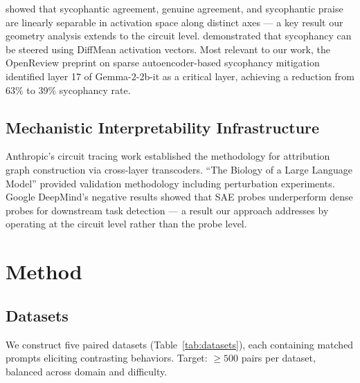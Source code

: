 \documentclass[11pt]{article}
\begin{document}
\citet{sycophancy2025notone} showed that sycophantic agreement, genuine agreement, and sycophantic praise are linearly separable in activation space along distinct axes — a key result our geometry analysis extends to the circuit level. \citet{rimsky2024steering} demonstrated that sycophancy can be steered using DiffMean activation vectors. Most relevant to our work, the OpenReview preprint on sparse autoencoder-based sycophancy mitigation \citep{sae_sycophancy2025} identified layer 17 of Gemma-2-2b-it as a critical layer, achieving a reduction from 63\% to 39\% sycophancy rate.

\subsection{Mechanistic Interpretability Infrastructure}

Anthropic's circuit tracing work \citep{anthropic2025circuit} established the methodology for attribution graph construction via cross-layer transcoders. ``The Biology of a Large Language Model'' \citep{biology2025} provided validation methodology including perturbation experiments. Google DeepMind's negative results \citep{gdm_negative2025} showed that SAE probes underperform dense probes for downstream task detection — a result our approach addresses by operating at the circuit level rather than the probe level.

\section{Method}
\label{sec:method}

\subsection{Datasets}

We construct five paired datasets (Table~\ref{tab:datasets}), each containing matched prompts eliciting contrasting behaviors. Target: $\geq 500$ pairs per dataset, balanced across domain and difficulty.
\end{document}
